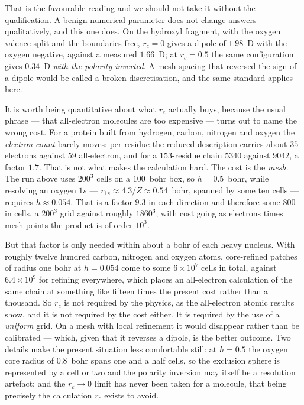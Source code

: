 \documentclass[11pt]{article}
\begin{document}
That is the favourable reading and we should not take it without the qualification. A benign
numerical parameter does not change answers qualitatively, and this one does. On the hydroxyl
fragment, with the oxygen valence split and the boundaries free, $r_c=0$ gives a dipole of
$1.98$~D with the oxygen negative, against a measured $1.66$~D; at $r_c=0.5$ the same
configuration gives $0.34$~D \emph{with the polarity inverted}. A mesh spacing that reversed the
sign of a dipole would be called a broken discretisation, and the same standard applies here.

It is worth being quantitative about what $r_c$ actually buys, because the usual phrase --- that
all-electron molecules are too expensive --- turns out to name the wrong cost. For a protein built
from hydrogen, carbon, nitrogen and oxygen the \emph{electron count} barely moves: per residue the
reduced description carries about $35$ electrons against $59$ all-electron, and for a
$153$-residue chain $5340$ against $9042$, a factor $1.7$. That is not what makes the calculation
hard. The cost is the \emph{mesh}. The run above uses $200^3$ cells on a $100$~bohr box, so
$h = 0.5$~bohr, while resolving an oxygen $1s$ --- $r_{1s}\approx 4.3/Z \approx 0.54$~bohr, spanned
by some ten cells --- requires $h \approx 0.054$. That is a factor $9.3$ in each direction and
therefore some $800$ in cells, a $200^3$ grid against roughly $1860^3$; with cost going as
electrons times mesh points the product is of order $10^{3}$.

But that factor is only needed within about a bohr of each heavy nucleus. With roughly twelve
hundred carbon, nitrogen and oxygen atoms, core-refined patches of radius one bohr at
$h = 0.054$ come to some $6\times10^{7}$ cells in total, against $6.4\times10^{9}$ for refining
everywhere, which places an all-electron calculation of the same chain at something like fifteen
times the present cost rather than a thousand. So $r_c$ is not required by the physics, as the
all-electron atomic results show, and it is not required by the cost either. It is required by the
use of a \emph{uniform} grid. On a mesh with local refinement it would disappear rather than be
calibrated --- which, given that it reverses a dipole, is the better outcome. Two details make the
present situation less comfortable still: at $h = 0.5$ the oxygen core radius of $0.8$~bohr spans
one and a half cells, so the exclusion sphere is represented by a cell or two and the polarity
inversion may itself be a resolution artefact; and the $r_c \rightarrow 0$ limit has never been
taken for a molecule, that being precisely the calculation $r_c$ exists to avoid.
\end{document}
